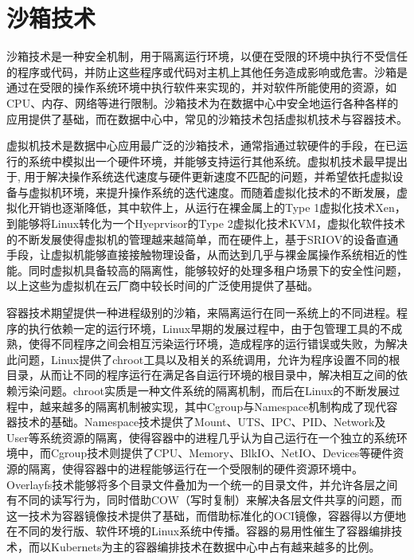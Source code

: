 \section{沙箱技术}


沙箱技术是一种安全机制，用于隔离运行环境，以便在受限的环境中执行不受信任的程序或代码，并防止这些程序或代码对主机上其他任务造成影响或危害。沙箱是通过在受限的操作系统环境中执行软件来实现的，并对软件所能使用的资源，如CPU、内存、网络等进行限制。沙箱技术为在数据中心中安全地运行各种各样的应用提供了基础，而在数据中心中，常见的沙箱技术包括虚拟机技术与容器技术。

虚拟机技术是数据中心应用最广泛的沙箱技术，通常指通过软硬件的手段，在已运行的系统中模拟出一个硬件环境，并能够支持运行其他系统。虚拟机技术最早提出于\citep{bugnion1997disco}, 用于解决操作系统迭代速度与硬件更新速度不匹配的问题，并希望依托虚拟设备与虚拟机环境，来提升操作系统的迭代速度。而随着虚拟化技术的不断发展，虚拟化开销也逐渐降低，其中软件上，从运行在裸金属上的Type 1虚拟化技术Xen\citep{barham2003xen}，到能够将Linux转化为一个Hyeprvisor的Type 2虚拟化技术KVM\citep{kivity2007kvm}，虚拟化软件技术的不断发展使得虚拟机的管理越来越简单，而在硬件上，基于SRIOV的设备直通手段\citep{dong2012high}，让虚拟机能够直接接触物理设备，从而达到几乎与裸金属操作系统相近的性能。同时虚拟机具备较高的隔离性，能够较好的处理多租户场景下的安全性问题，以上这些为虚拟机在云厂商中较长时间的广泛使用提供了基础。

容器技术期望提供一种进程级别的沙箱，来隔离运行在同一系统上的不同进程。程序的执行依赖一定的运行环境，Linux早期的发展过程中，由于包管理工具的不成熟，使得不同程序之间会相互污染运行环境，造成程序的运行错误或失败，为解决此问题，Linux提供了chroot工具以及相关的系统调用，允许为程序设置不同的根目录，从而让不同的程序运行在满足各自运行环境的根目录中，解决相互之间的依赖污染问题。chroot实质是一种文件系统的隔离机制，而后在Linux的不断发展过程中，越来越多的隔离机制被实现，其中Cgroup与Namespace机制构成了现代容器技术的基础。Namespace技术提供了Mount、UTS、IPC、PID、Network及User等系统资源的隔离，使得容器中的进程几乎认为自己运行在一个独立的系统环境中，而Cgroup技术则提供了CPU、Memory、BlkIO、NetIO、Devices等硬件资源的隔离，使得容器中的进程能够运行在一个受限制的硬件资源环境中。Overlayfs技术能够将多个目录文件叠加为一个统一的目录文件，并允许各层之间有不同的读写行为，同时借助COW（写时复制）来解决各层文件共享的问题，而这一技术为容器镜像技术提供了基础，而借助标准化的OCI镜像，容器得以方便地在不同的发行版、软件环境的Linux系统中传播。容器的易用性催生了容器编排技术，而以Kubernets为主的容器编排技术在数据中心中占有越来越多的比例。

